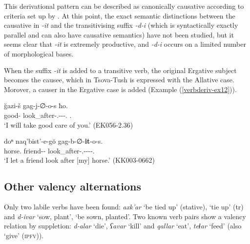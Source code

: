 
This derivational pattern can be described as canonically causative according to criteria set up by \textcite[240]{dixon2012blt3}. At this point, the exact semantic distinctions between the causative in \textit{-it} and the transitivising suffix \textit{-d-i} (which is syntactically exactly parallel and can also have causative semantics) have not been studied, but it seems clear that \textit{-it} is extremely productive, and \textit{-d-i} occurs on a limited number of morphological bases.

When the suffix \textit{-it} is added to a transitive verb, the original Ergative subject becomes the causee, which in Tsova-Tush is expressed with the Allative case. Morover, a causer in the Ergative case is added (Example (\ref{verbderiv-ex12})).

\begin{exe}
	\ex\label{verbderiv-ex12}
	\begin{xlist}
		
		
			\ex\label{verbderiv-ex12a}
			\gll \u{g}azi-š gag-j-∅-o-s ħo. \\
			good-{\Adv} look\_after-{\F}.{\Sg}-{\Tr}-{\Npst}-{\Fsg}.{\Erg} {\Ssg}.{\Nom}\\
			\trans `I will take good care of you.'
			\hfill (EK056-2.36)
		
		
		
			\ex\label{verbderiv-ex12b}
			\gll doⁿ naq'bist'-e-g\u{o} gag-b-∅-\textbf{it}-o-s.  \\
			horse.{\Nom} friend-{\Obl}-{\All} look\_after-{\B}.{\Sg}-{\Tr}-\textbf{{\Caus}}-{\Npst}-{\Fsg}.{\Erg} \\
			\trans `I let a friend look after [my] horse.'
			\hfill (KK003-0662)
		
		
		
		
	\end{xlist}
\end{exe}

\subsection{Other valency alternations}

Only two labile verbs have been found: \textit{axk'ar} `be tied up' (stative), `tie up' (tr) and \textit{d-ivar} `sow, plant', `be sown, planted'. Two known verb pairs show a valency relation by suppletion: \textit{d-alar} `die', \textit{ʕavar} `kill' and \textit{qallar} `eat', \textit{teɬar} `feed' (also `give' (\textsc{ipfv})).


